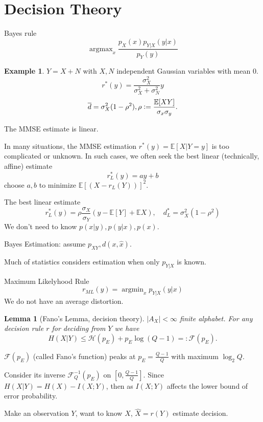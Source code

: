 \documentclass{report}
\newcommand{\matE}{\mathbb{E}}
\DeclareMathOperator*{\argmax}{\arg \max}
\DeclareMathOperator*{\argmin}{\arg \min}
\newcommand{\defeq}{\vcentcolon=}
\newcommand{\eqdef}{=\mathrel{\mathop:}}
\newtheorem{lemma}{Lemma}[section]
\theoremstyle{definition}
\newtheorem{example}{Example}[section]
\theoremstyle{remark}
\numberwithin{equation}{section}
\begin{document}
\section{Decision Theory}


Bayes rule \[\argmax_x \frac{p_X(x)p_{Y|X}(y|x)}{p_Y(y)}\]

\begin{example}
  $Y = X + N$ with $X, N$ independent Gaussian variables with mean $0$.
  \[r^*(y) = \frac{\sigma_X^2}{\sigma_X^2+\sigma_N^2}y\]
  \[\overline{d} = \sigma_X^2(1 - \rho^2), \rho \defeq \frac{\matE[XY]}{\sigma_x\sigma_y}.\]
\end{example}
The MMSE estimate is linear.

In many situations, the MMSE estimation $r^*(y) = \matE[X|Y=y]$ is too complicated or unknown.
In such cases, we often seek the best linear (technically, affine) estimate \[
  r^*_L(y) = ay + b  
\] choose $a, b$ to minimize $\matE[(X - r_L(Y))]^2$.

The best linear estimate \[r^*_L(y) = \rho\frac{\sigma_X}{\sigma_Y}(y - \matE[Y] + \matE{X}), \quad d^*_L = \sigma^2_X(1 - \rho^2)\] We don't need to know $p(x|y), p(y|x), p(x)$.

Bayes Estimation: assume $p_{XY}, d(x, \hat{x})$.

Much of statistics considers estimation when only $p_{Y|X}$ is known.

Maximum Likelyhood Rule \[r_{ML}(y) = \argmin_x p_{Y|X}(y|x)\] We do not have an average distortion.

\begin{lemma}[Fano's Lemma, decision theory]
  $|A_X| < \infty$ finite alphabet. For any decision rule $r$ for deciding from $Y$ we have \[H(X|Y) \leq \mathscr{H}(p_E) + p_E\log(Q - 1) \eqdef \mathscr{F}(p_E).\]
\end{lemma}
$\mathscr{F}(p_E)$ (called Fano's function) peaks at $p_E = \frac{Q-1}{Q}$ with maximum $\log_2Q$.

Consider its inverse $\mathscr{F}^{-1}_Q(p_E)$ on $\left[0, \frac{Q-1}{Q}\right]$. Since $H(X|Y) = H(X) - I(X; Y)$, then as $I(X; Y)$ affects the lower bound of error probability.

Make an observation $Y$, want to know $X$, $\hat{X} = r(Y)$ estimate decision.
\end{document}
